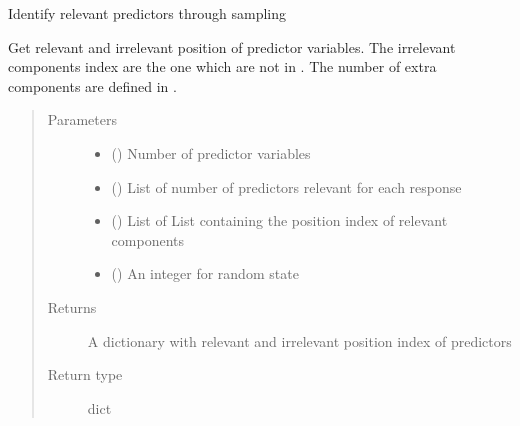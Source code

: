 \documentclass[letterpaper,10pt,english]{sphinxmanual}
\begin{document}

\begin{fulllineitems}
\label{\detokenize{Utilities:pysimrel.utilities.get_relpred}}
Identify relevant predictors through sampling

Get relevant and irrelevant position of predictor variables. The irrelevant
components index are the one which are not in . The number of extra components
are defined in .
\begin{quote}\begin{description}
\item[{Parameters}] \leavevmode\begin{itemize}
\item {} 
 () \textendash{} Number of predictor variables

\item {} 
 () \textendash{} List of number of predictors relevant for each response

\item {} 
 () \textendash{} List of List containing the position index of relevant components

\item {} 
 () \textendash{} An integer for random state

\end{itemize}

\item[{Returns}] \leavevmode
A dictionary with relevant and irrelevant position index of predictors

\item[{Return type}] \leavevmode
dict

\end{description}\end{quote}

\end{fulllineitems}
\end{document}

